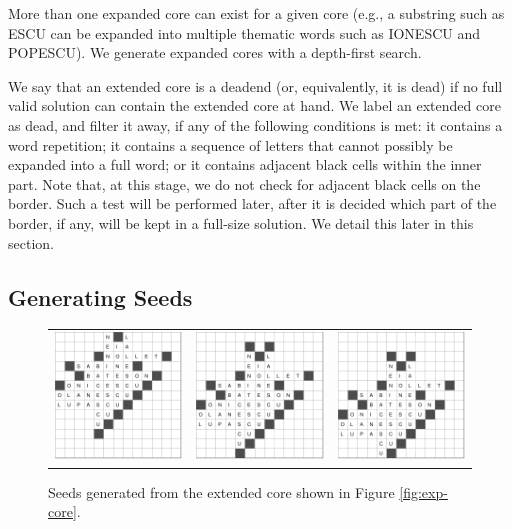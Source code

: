 More than one expanded core can exist for a given core (e.g., a substring such as {\sf\small ESCU} can be expanded into multiple thematic words such as {\sf\small IONESCU} and {\sf\small POPESCU}).
We generate expanded cores with a depth-first search.

We say that an extended core is a deadend (or, equivalently, it is dead) if no full valid solution can contain the extended core at hand. We label an extended core as dead, and filter it away, if any of the
following conditions is met:
it contains a word repetition; it contains a sequence of letters that cannot
possibly be expanded into a full word; or it contains adjacent black cells within the inner part.
Note that, at this stage, we do not check for adjacent black cells on the border.
Such a test will be performed later, after it is decided which part of the
border, if any, will be kept in a full-size solution. We detail this later in this section.


\subsection{Generating Seeds}

\begin{figure}
\centering
\begin{tabular}{ccc}
\includegraphics[width=.32\textwidth]{_plots/alive-0-puzzle-72-2975-1488--1--1.pdf} &
\includegraphics[width=.32\textwidth]{_plots/alive-0-puzzle-72-2975-1488--1-1.pdf} & 
\includegraphics[width=.32\textwidth]{_plots/alive-0-puzzle-72-2975-1488--1-2.pdf}
\end{tabular}
\caption{Seeds generated from the extended core shown in Figure \ref{fig:exp-core}.}
\label{fig:seeds}
\end{figure}

